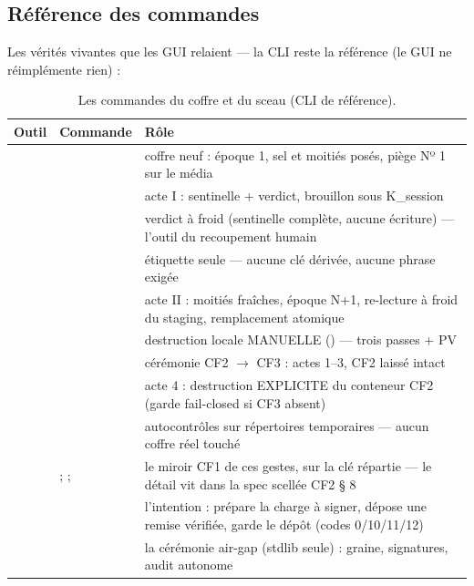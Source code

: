 \subsection{Référence des commandes}\label{sec:commandes}

Les vérités vivantes que les GUI relaient — la CLI reste la référence (le GUI ne
réimplémente rien) :

\begin{table}[htbp]
\centering\small
\caption{Les commandes du coffre et du sceau (CLI de référence).}
\label{tab:commandes}
\begin{tabularx}{\textwidth}{@{}l >{\raggedright\arraybackslash}p{4.3cm} Y@{}}
\toprule
\textbf{Outil} & \textbf{Commande} & \textbf{Rôle} \\
\midrule
{} &  & coffre neuf : époque 1, sel et moitiés posés,
piège Nº 1 sur le média \\
 &  & acte I : sentinelle + verdict, brouillon sous K\_session \\
 &  & verdict à froid (sentinelle complète, aucune écriture) —
l'outil du recoupement humain \\
 &  & étiquette seule — aucune clé dérivée, aucune phrase exigée \\
 &  & acte II : moitiés fraîches, époque N+1, re-lecture à froid du
staging, remplacement atomique \\
 &  & destruction locale MANUELLE () — trois
passes + PV \\
 &  & cérémonie CF2 $\to$ CF3 : actes 1--3, CF2 laissé intact \\
 &  & acte 4 : destruction EXPLICITE du conteneur CF2 (garde
fail-closed si CF3 absent) \\
 &  & autocontrôles sur répertoires temporaires — aucun coffre réel
touché \\
 &  ;  ;  & le miroir CF1 de
ces gestes, sur la clé répartie — le détail vit dans la spec scellée CF2 § 8 \\
 &  &
l'intention : prépare la charge à signer, dépose une remise vérifiée, garde le dépôt
(codes 0/10/11/12) \\
 &  & la cérémonie
air-gap (stdlib seule) : graine, signatures, audit autonome \\
\bottomrule
\end{tabularx}
\end{table}

